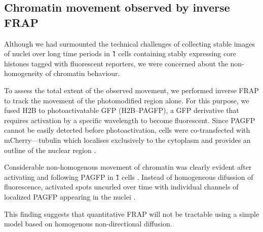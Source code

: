 

    \subsection{Chromatin movement observed by inverse FRAP}

    Although we had surmounted the technical challenges of collecting 
    stable images of nuclei over long time periods 
    in \G1{} cells containing stably expressing core histones tagged with fluorescent reporters,
    we were concerned about the non-homogeneity of chromatin behaviour.

    To assess the total extent of the observed movement, we performed inverse FRAP
    to track the movement of the photomodified region alone.
    For this purpose, we fused H2B to photoactivatable GFP (H2B--PAGFP), 
    a GFP derivative that requires activation by a specific wavelength to become fluorescent.
    Since PAGFP cannot be easily detected before photoactivation, 
    cells were co-transfected with mCherry--\textalpha--tubulin 
    which localises exclusively to the cytoplasm 
    and provides an outline of the nuclear region .

    Considerable non-homogenous movement of chromatin was clearly evident 
    after activating and following PAGFP in \G1{} cells .
    Instead of homogeneous difussion of fluorescence,
    activated spots uncurled over time with individual channels of
    localized PAGFP appearing in the nuclei .

    This finding suggests that quantitative FRAP will not be tractable using 
    a simple model based on homogenous non-directional diffusion.

